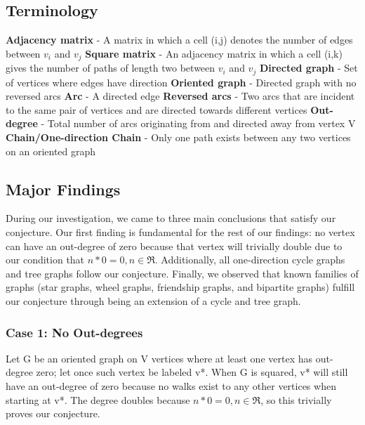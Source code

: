 \documentclass{article}
\begin{document}
\subsection{Terminology}
\begin{flushleft}
\textbf{Adjacency matrix} - A matrix in which a cell (i,j) denotes the number of edges between $v_i$ and $v_j$ \break 
\break
\textbf{Square matrix} - An adjacency matrix in which a cell (i,k) gives the number of paths of length two between  $v_i$ and $v_j$ \break
\break
\textbf{Directed graph} - Set of vertices where edges have direction \break
\break
\textbf{Oriented graph} - Directed graph with no reversed arcs \break
\break
\textbf{Arc} - A directed edge \break
\break
\textbf{Reversed arcs} - Two arcs that are incident to the same pair of vertices and are directed towards different vertices \break 
\break
\textbf{Out-degree} - Total number of arcs originating from and directed away from vertex V \break
\break
\textbf{Chain/One-direction Chain} - Only one path exists between any two vertices on an oriented graph
\end{flushleft}

\subsection{Major Findings}
During our investigation, we came to three main conclusions that satisfy our conjecture. Our first finding is fundamental for the rest of our findings: no vertex can have an out-degree of zero because that vertex will trivially double due to our condition that $n*0=0,n\in\Re$. Additionally, all one-direction cycle graphs and tree graphs follow our conjecture. Finally, we observed that known families of graphs (star graphs, wheel graphs, friendship graphs, and bipartite graphs) fulfill our conjecture through being an extension of a cycle and tree graph. 

\subsubsection{Case 1: No Out-degrees}
Let G be an oriented graph on V vertices where at least one vertex has out-degree zero; let once such vertex be labeled v*. When G is squared, v* will still have an out-degree of zero because no walks exist to any other vertices when starting at v*. The degree doubles because $n*0=0,n\in\Re$, so this trivially proves our conjecture.
\end{document}
